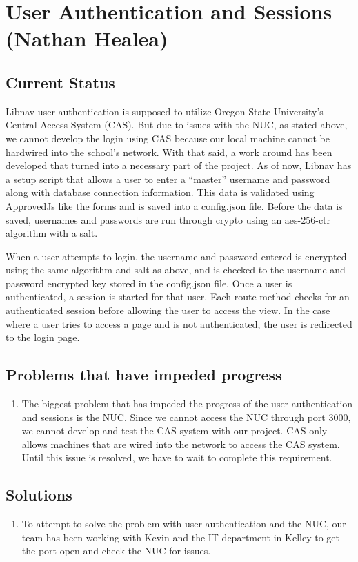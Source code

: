 \documentclass[letterpaper,10pt,titlepage, onecolumn, compsoc]{IEEEtran}
\begin{document}
\section{User Authentication and Sessions (Nathan Healea)}
\subsection{Current Status}
Libnav user authentication is supposed to utilize Oregon State University’s Central Access System (CAS). But due to issues with the NUC, as stated above, we cannot develop the login using CAS because our local machine cannot be hardwired into the school’s network. With that said, a work around has been developed that turned into a necessary part of the project. As of now, Libnav has a setup script that allows a user to enter a “master” username and password along with database connection information. This data is validated using ApprovedJs like the forms and is saved into a config.json file. Before the data is saved, usernames and passwords are run through crypto using an aes-256-ctr algorithm with a salt. 

When a user attempts to login, the username and password entered is encrypted using the same algorithm and salt as above, and is checked to the username and password encrypted key stored in the config.json file. Once a user is authenticated, a session is started for that user. Each route method checks for an  authenticated session before allowing the user to access the view. In the case where a user tries to access a page and is not authenticated, the user is redirected to the login page. 

\subsection{Problems that have impeded progress}
\begin{enumerate}
	\item The biggest problem that has impeded the progress of the user authentication and sessions is the NUC. Since we cannot access the NUC through port 3000, we cannot develop and test the CAS system with our project. CAS only allows machines that are wired into the network to access the CAS system. Until this issue is resolved, we have to wait to complete this requirement.
\end{enumerate}

\subsection{Solutions}
\begin{enumerate}
	\item To attempt to solve the problem with user authentication and the NUC, our team has been working with Kevin and the IT department in Kelley to get the port open and check the NUC for issues. 
\end{enumerate}
\end{document}
